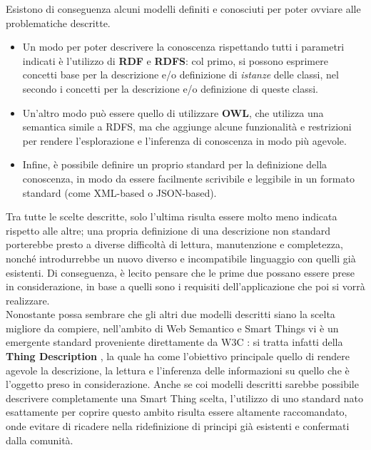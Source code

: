 \documentclass[12pt,a4paper,openright,oneside]{report}
\begin{document}
Esistono di conseguenza alcuni modelli definiti e conosciuti per poter ovviare alle problematiche descritte. 

\begin{itemize}
	\item Un modo per poter descrivere la conoscenza rispettando tutti i parametri indicati è l'utilizzo di \textbf{RDF} e \textbf{RDFS}: col primo, si possono esprimere concetti base per la descrizione e/o definizione di \textit{istanze} delle classi, nel secondo i concetti per la descrizione e/o definizione di queste classi.
	
	\item Un'altro modo può essere quello di utilizzare \textbf{OWL}, che utilizza una semantica simile a RDFS, ma che aggiunge alcune funzionalità e restrizioni per rendere l'esplorazione e l'inferenza di conoscenza in modo più agevole.
	
	\item Infine, è possibile definire un proprio standard per la definizione della conoscenza, in modo da essere facilmente scrivibile e leggibile in un formato standard (come XML-based o JSON-based).
\end{itemize}

Tra tutte le scelte descritte, solo l'ultima risulta essere molto meno indicata rispetto alle altre; una propria definizione di una descrizione non standard porterebbe presto a diverse difficoltà di lettura, manutenzione e completezza, nonché introdurrebbe un nuovo diverso e incompatibile linguaggio con quelli già esistenti. Di conseguenza, è lecito pensare che le prime due possano essere prese in considerazione, in base a quelli sono i requisiti dell'applicazione che poi si vorrà realizzare.\\

Nonostante possa sembrare che gli altri due modelli descritti siano la scelta migliore da compiere, nell'ambito di Web Semantico e Smart Things vi è un emergente standard proveniente direttamente da W3C \cite{w3c}: si tratta infatti della \textbf{Thing Description} \cite{td}, la quale ha come l'obiettivo principale quello di rendere agevole la descrizione, la lettura e l'inferenza delle informazioni su quello che è l'oggetto preso in considerazione. Anche se coi modelli descritti sarebbe possibile descrivere completamente una Smart Thing scelta, l'utilizzo di uno standard nato esattamente per coprire questo ambito risulta essere altamente raccomandato, onde evitare di ricadere nella ridefinizione di principi già esistenti e confermati dalla comunità.\\
\end{document}

